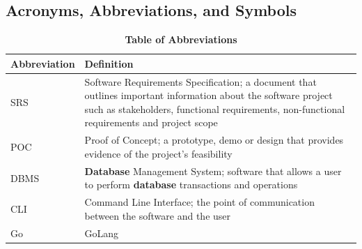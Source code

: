 \documentclass[12pt, titlepage]{article}
\begin{document}
\subsection{Acronyms, Abbreviations, and Symbols}
	
\begin{table}[H]
\caption{\textbf{Table of Abbreviations}} \label{Table}

\begin{tabularx}{\textwidth}{p{3cm}X}
\toprule
\textbf{Abbreviation} & \textbf{Definition} \\
\midrule
SRS & Software Requirements Specification; a document that outlines important information about the software project such as stakeholders, functional requirements, non-functional requirements and project scope \\
POC & Proof of Concept; a prototype, demo or design that provides evidence of the project's feasibility \\
DBMS & \textbf{Database} Management System; software that allows a user to perform \textbf{database} transactions and operations\\
CLI & Command Line Interface; the point of communication between the software and the user \\
Go & GoLang \\
\bottomrule
\end{tabularx}

\end{table}
\end{document}

